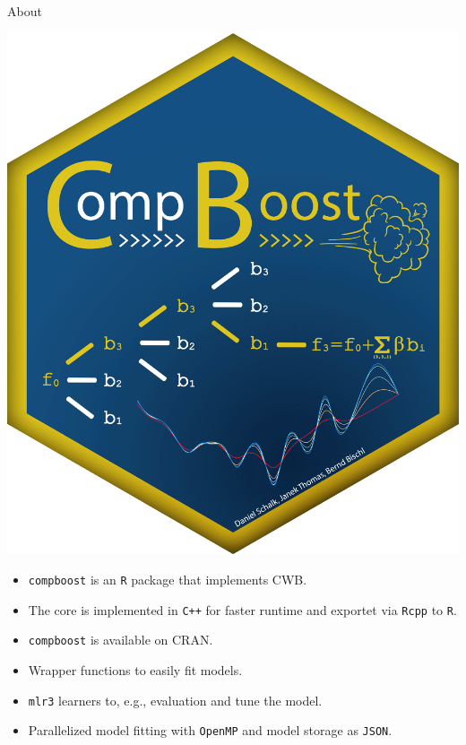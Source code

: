 \documentclass[t,10pt]{beamer}
\begin{document}
\begin{frame}{About}
  \begin{minipage}[t]{0.18\textwidth}
    \includegraphics[width=\linewidth]{figures/fig-compboost-logo.png}
  \end{minipage}
  \begin{minipage}{0.8\textwidth}
  \begin{itemize}
    \item
      \texttt{compboost} is an \texttt{R} package that implements CWB.
    \item
      The core is implemented in \texttt{C++} for faster runtime and exportet via \texttt{Rcpp} to \texttt{R}.
    \item
      \texttt{compboost} is available on CRAN.
    \item
      Wrapper functions to easily fit models.
    \item
      \texttt{mlr3} learners to, e.g., evaluation and tune the model.
    \item
      Parallelized model fitting with \texttt{OpenMP} and model storage as \texttt{JSON}.
  \end{itemize}
  \end{minipage}
\end{frame}
\end{document}
